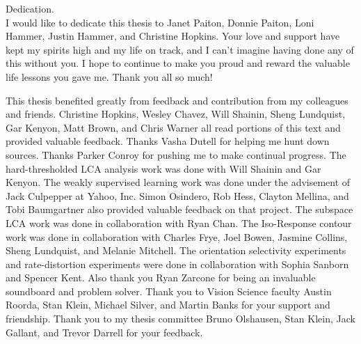 \documentclass{ucbthesis}
\begin{document}
\begin{frontmatter}

\begin{dedication}
\null\vfil
\begin{center}
Dedication.\\\vspace{12pt}
I would like to dedicate this thesis to Janet Paiton, Donnie Paiton, Loni Hammer, Justin Hammer, and Christine Hopkins. Your love and support have kept my spirits high and my life on track, and I can't imagine having done any of this without you. I hope to continue to make you proud and reward the valuable life lessons you gave me. Thank you all so much!
\end{center}
\vfil\null
\end{dedication}


\tableofcontents
\clearpage
\listoffigures
\listoftables

\begin{acknowledgements}
This thesis benefited greatly from feedback and contribution from my colleagues and friends. Christine Hopkins, Wesley Chavez, Will Shainin, Sheng Lundquist, Gar Kenyon, Matt Brown, and Chris Warner all read portions of this text and provided valuable feedback. Thanks Vasha Dutell for helping me hunt down sources. Thanks Parker Conroy for pushing me to make continual progress. The hard-thresholded LCA analysis work was done with Will Shainin and Gar Kenyon. The weakly supervised learning work was done under the advisement of Jack Culpepper at Yahoo, Inc. Simon Osindero, Rob Hess, Clayton Mellina, and Tobi Baumgartner also provided valuable feedback on that project. The subspace LCA work was done in collaboration with Ryan Chan. The Iso-Response contour work was done in collaboration with Charles Frye, Joel Bowen, Jasmine Collins, Sheng Lundquist, and Melanie Mitchell. The orientation selectivity experiments and rate-distortion experiments were done in collaboration with Sophia Sanborn and Spencer Kent. Also thank you Ryan Zarcone for being an invaluable soundboard and problem solver. Thank you to Vision Science faculty Austin Roorda, Stan Klein, Michael Silver, and Martin Banks for your support and friendship. Thank you to my thesis committee Bruno Olshausen, Stan Klein, Jack Gallant, and Trevor Darrell for your feedback.


\end{acknowledgements}
\end{frontmatter}
\end{document}
